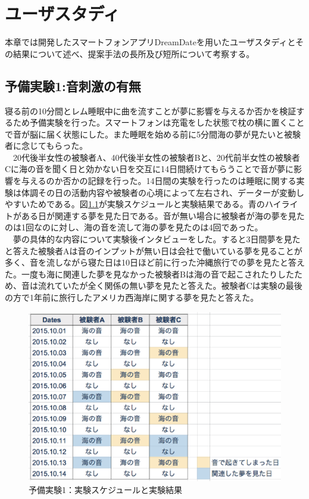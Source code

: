 \chapter{ユーザスタディ}
\label{chap:visualize}

本章では開発したスマートフォンアプリDreamDateを用いたユーザスタディとその結果について述べ、提案手法の長所及び短所について考察する。

\section{予備実験1:音刺激の有無}
寝る前の10分間とレム睡眠中に曲を流すことが夢に影響を与えるか否かを検証するため予備実験を行った。スマートフォンは充電をした状態で枕の横に置くことで音が脳に届く状態にした。また睡眠を始める前に5分間海の夢が見たいと被験者に念じてもらった。\\
　20代後半女性の被験者A、40代後半女性の被験者Bと、20代前半女性の被験者Cに海の音を聞く日と効かない日を交互に14日間続けてもらうことで音が夢に影響を与えるのか否かの記録を行った。14日間の実験を行ったのは睡眠に関する実験は体調その日の活動内容や被験者の心境によって左右され、データーが変動しやすいためである。図\ref{experiment1}が実験スケジュールと実験結果である。青のハイライトがある日が関連する夢を見た日である。音が無い場合に被験者が海の夢を見たのは1回なのに対し、海の音を流して海の夢を見たのは4回であった。\\
　夢の具体的な内容について実験後インタビューをした。すると3日間夢を見たと答えた被験者Aは音のインプットが無い日は会社で働いている夢を見ることが多く、音を流しながら寝た日は10日ほど前に行った沖縄旅行での夢を見たと答えた。一度も海に関連した夢を見なかった被験者Bは海の音で起こされたりしたため、音は流れていたが全く関係の無い夢を見たと答えた。被験者Cは実験の最後の方で1年前に旅行したアメリカ西海岸に関する夢を見たと答えた。

\begin{figure}[htbp]
\begin{center}
\includegraphics[width=13cm]{eps/schedule0.eps}
\caption{予備実験1：実験スケジュールと実験結果}
\label{experiment1}
\end{center}
\end{figure}

